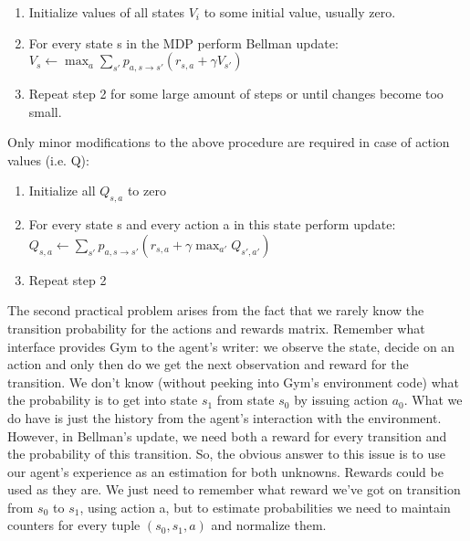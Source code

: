 \begin{enumerate}
  \item Initialize values of all states \begin{math}V_i\end{math} to some
    initial value, usually zero.
  \item For every state s in the MDP perform Bellman update: \begin{math}V_s \leftarrow
    \max_a \sum_{s'}p_{a,s \rightarrow s'}(r_{s,a} + \gamma V_{s'})\end{math}
  \item Repeat step 2 for some large amount of steps or until changes become too small.
\end{enumerate}

Only minor modifications to the above procedure are required in case of action values (i.e. Q):


\begin{enumerate}
  \item Initialize all \begin{math}Q_{s,a}\end{math} to zero
  \item For every state s and every action a in this state perform
    update: \begin{math}Q_{s,a} \leftarrow \sum_{s'}p_{a,s \rightarrow
        s'}(r_{s,a} + \gamma \max_{a'}Q_{s',a'})\end{math}
  \item Repeat step 2
\end{enumerate}


The second practical problem arises from the fact that we rarely know the transition
probability for the actions and rewards matrix. Remember what interface provides
Gym to the agent’s writer: we observe the state, decide on an action and only
then do we get the next observation and reward for the transition. We don’t know
(without peeking into Gym’s environment code) what the probability is to get into
state \begin{math}s_1\end{math} from state \begin{math}s_0\end{math} by issuing action
\begin{math}a_0\end{math}. What we do have is just the history from
the agent’s interaction with the environment. However, in Bellman’s update, we
need both a reward for every transition and the probability of this transition. So,
the obvious answer to this issue is to use our agent’s experience as an estimation
for both unknowns. Rewards could be used as they are. We just need to remember
what reward we’ve got on transition from \begin{math}s_0\end{math} to \begin{math}s_1\end{math},
using action a, but to estimate
probabilities we need to maintain counters for every tuple \begin{math}(s_0, s_1, a)\end{math} and normalize
them.

